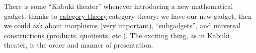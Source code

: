 \M
There is some ``Kabuki theater'' whenever introducing a new mathematical
gadget, thanks to \ifblog\href{https://texnicalstuff.blogspot.com/2009/08/object-oriented-math-category-theory-as.html}{category theory}:\else category theory:\fi
we have our new gadget, then we could ask about morphisms (very
important), ``subgadgets'', and universal constructions (products,
quotients, etc.). The exciting thing, as in Kabuki theater, is the order
and manner of presentation.




